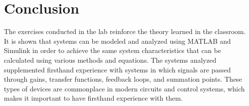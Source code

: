 \documentclass[12pt]{article}
\begin{document}
\section*{\fontsize{12}{12}\selectfont \large Conclusion}
The exercises conducted in the lab reinforce the theory learned in the classroom. It is shown that systems can be modeled and analyzed using MATLAB and Simulink in order to achieve the same system characteristics that can be calculated using various methods and equations. The systems analyzed supplemented firsthand experience with systems in which signals are passed through gains, transfer functions, feedback loops, and summation points. These types of devices are commonplace in modern circuits and control systems, which makes it important to have firsthand experience with them.




\begin{thebibliography}{2}


\end{thebibliography}




\end{document}

